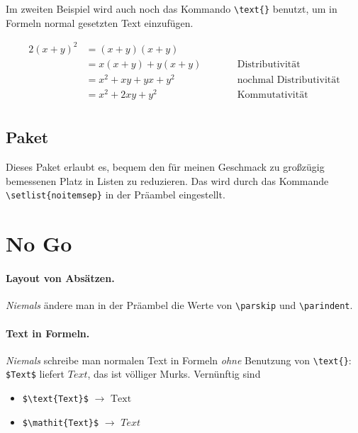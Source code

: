Im zweiten Beispiel wird auch noch das Kommando
\verb|\text{|\verb|}| benutzt, um in Formeln normal gesetzten Text
einzufügen.

\begin{tcblisting}{}
  \begin{alignat*}{2}
    (x+y)^2 
    &= (x+y) (x+y)          \\
    &= x(x+y) + y(x+y)      &\qquad& \text{Distributivität} \\
    &= x^2 + xy + yx + y^2  && \text{nochmal Distributivität}\\
    &= x^2 + 2xy + y^2      && \text{Kommutativität}\\
  \end{alignat*}
\end{tcblisting}

\subsection{Paket }

Dieses Paket erlaubt es, bequem den für meinen Geschmack zu großzügig
bemessenen Platz in Listen zu reduzieren.
%
Das wird durch das Kommande \verb|\setlist{noitemsep}| in der Präambel
eingestellt.

\section{No Go}
\label{sec:no-go}

\paragraph{Layout von Absätzen.} \emph{Niemals} 
%
ändere man in der Präambel die Werte von \verb|\parskip| und
\verb|\parindent|.

\paragraph{Text in Formeln.} \emph{Niemals}
%
schreibe man normalen Text in Formeln \emph{ohne} Benutzung von
\verb|\text{}|: \verb|$Text$| liefert $Text$, das ist völliger Murks.
Vernünftig sind
\begin{itemize}
\item \verb|$\text{Text}$| $\to$ $\text{Text}$
\item \verb|$\mathit{Text}$| $\to$ $\mathit{Text}$
\end{itemize}


